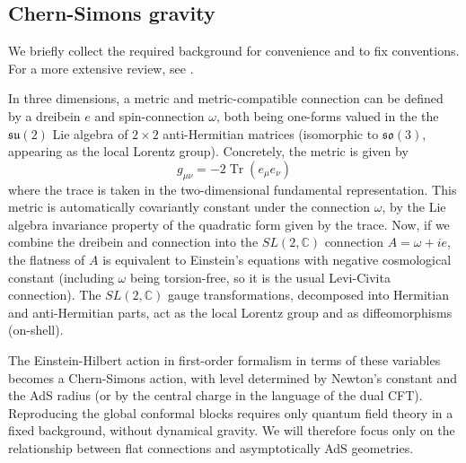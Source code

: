 \documentclass[12pt]{article}
\newcommand{\CC}{\mathbb{C}}
\newcommand{\lie}[1]{\mathfrak{#1}}
\DeclareMathOperator{\Tr}{Tr}
\begin{document}
\subsection{Chern-Simons gravity}
We briefly collect the required background for convenience and to fix conventions. For a more extensive review, see \cite{Ammon:2012wc}.

In three dimensions, a metric and metric-compatible connection can be defined by a dreibein $e$ and spin-connection $\omega$, both being one-forms valued in the the $\lie{su}(2)$ Lie algebra of $2\times 2$ anti-Hermitian matrices (isomorphic to $\lie{so}(3)$, appearing as the local Lorentz group). Concretely, the metric is given by
\begin{equation}\label{dreibeinMetric}
	g_{\mu\nu}=-2\Tr(e_\mu e_\nu)
\end{equation}
where the trace is taken in the two-dimensional fundamental representation. This metric is automatically covariantly constant under the connection $\omega$, by the Lie algebra invariance property of the quadratic form given by the trace. Now, if we combine the dreibein and connection into the $SL(2,\CC)$ connection $A=\omega + i e$, the flatness of $A$ is equivalent to Einstein's equations with negative cosmological constant (including $\omega$ being torsion-free, so it is the usual Levi-Civita connection). The $SL(2,\CC)$ gauge transformations, decomposed into Hermitian and anti-Hermitian parts, act as the local Lorentz group and as diffeomorphisms (on-shell).

The Einstein-Hilbert action in first-order formalism in terms of these variables becomes a Chern-Simons action, with level determined by Newton's constant and the AdS radius (or by the central charge in the language of the dual CFT). Reproducing the global conformal blocks requires only quantum field theory in a fixed background, without dynamical gravity.  We will therefore focus only on the relationship between flat connections and asymptotically AdS geometries.
\end{document}
